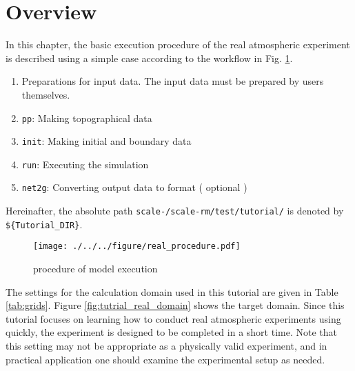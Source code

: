 \section{Overview} \label{sec:tutrial_real_intro}
In this chapter, the basic execution procedure of the real atmospheric experiment is described using a simple case according to the workflow in Fig. \ref{fig:howto}.
\begin{enumerate}
\item Preparations for input data. The input data must be prepared by users themselves.
\item \texttt{pp}:   Making topographical data
\item \texttt{init}: Making initial and boundary data
\item \texttt{run}:  Executing the simulation
\item \texttt{net2g}: Converting {\netcdf} output data to {\grads} format ( optional )
\end{enumerate}
Hereinafter, the absolute path \texttt{scale-{\version}/scale-rm/test/tutorial/} is denoted by\\
\verb|${Tutorial_DIR}|.

\begin{figure}[tb]
\begin{center}
  \texttt{[image: ./../../figure/real\_procedure.pdf]}\\
  \caption{\scalerm procedure of model execution}
  \label{fig:howto}
\end{center}
\end{figure}

The settings for the calculation domain used in this tutorial are given in Table \ref{tab:grids}.
Figure \ref{fig:tutrial_real_domain} shows the target domain.
Since this tutorial focuses on learning how to conduct 
real atmospheric experiments using \scalerm quickly,
the experiment is designed to be completed in a short time.
Note that this setting may not be appropriate as a physically valid experiment, 
and in practical application one should examine the experimental setup as needed.

